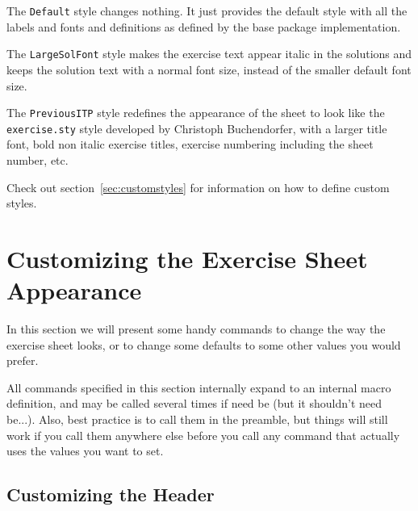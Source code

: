\documentclass[11pt,a4paper]{article}
\begin{document}
The \texttt{Default} style changes nothing. It just provides the default style with all
the labels and fonts and definitions as defined by the base package implementation.

The \texttt{LargeSolFont} style makes the exercise text appear italic in the solutions and
keeps the solution text with a normal font size, instead of the smaller default font
size.

The \texttt{PreviousITP} style redefines the appearance of the sheet to look like the
\texttt{exercise.sty} style developed by Christoph Buchendorfer, with a larger title font,
bold non italic exercise titles, exercise numbering including the sheet number, etc.

Check out section~\ref{sec:customstyles} for information on how to define custom styles.

\section{Customizing the Exercise Sheet Appearance}
\label{sec:CustomizeSheet}

In this section we will present some handy commands to change the way the exercise sheet
looks, or to change some defaults to some other values you would prefer.

All  commands specified in this section internally expand to
an internal macro definition, and may be called several times if need be (but it shouldn't
need be...). Also, best practice is to call them in the preamble, but things will still
work if you call them anywhere else before you call any command that actually uses the
values you want to set.

\subsection{Customizing the Header}
\label{sec:CustomHeader}


\end{document}
